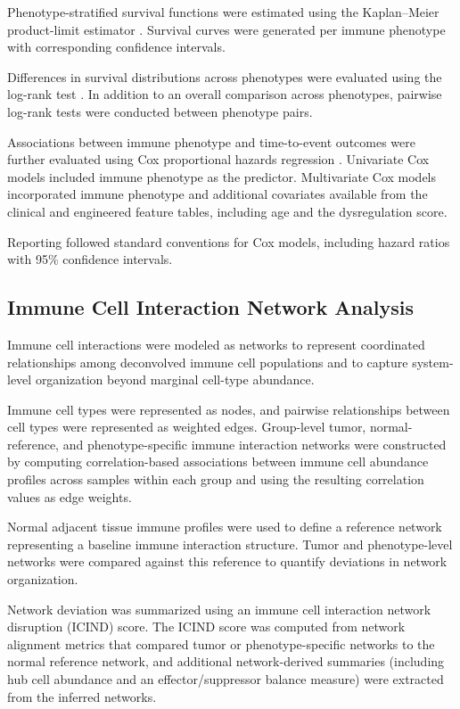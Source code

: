 \documentclass[conference]{IEEEtran}
\begin{document}
Phenotype-stratified survival functions were estimated using the Kaplan--Meier product-limit estimator \cite{KaplanMeier1958}.
Survival curves were generated per immune phenotype with corresponding confidence intervals.

Differences in survival distributions across phenotypes were evaluated using the log-rank test \cite{Mantel1966}.
In addition to an overall comparison across phenotypes, pairwise log-rank tests were conducted between phenotype pairs.

Associations between immune phenotype and time-to-event outcomes were further evaluated using Cox proportional hazards regression \cite{Cox1972}.
Univariate Cox models included immune phenotype as the predictor.
Multivariate Cox models incorporated immune phenotype and additional covariates available from the clinical and engineered feature tables, including age and the dysregulation score.

Reporting followed standard conventions for Cox models, including hazard ratios with 95\% confidence intervals.

\subsection{Immune Cell Interaction Network Analysis}
Immune cell interactions were modeled as networks to represent coordinated relationships among deconvolved immune cell populations and to capture system-level organization beyond marginal cell-type abundance.

Immune cell types were represented as nodes, and pairwise relationships between cell types were represented as weighted edges.
Group-level tumor, normal-reference, and phenotype-specific immune interaction networks were constructed by computing correlation-based associations between immune cell abundance profiles across samples within each group and using the resulting correlation values as edge weights.

Normal adjacent tissue immune profiles were used to define a reference network representing a baseline immune interaction structure.
Tumor and phenotype-level networks were compared against this reference to quantify deviations in network organization.

Network deviation was summarized using an immune cell interaction network disruption (ICIND) score.
The ICIND score was computed from network alignment metrics that compared tumor or phenotype-specific networks to the normal reference network, and additional network-derived summaries (including hub cell abundance and an effector/suppressor balance measure) were extracted from the inferred networks.
\end{document}
